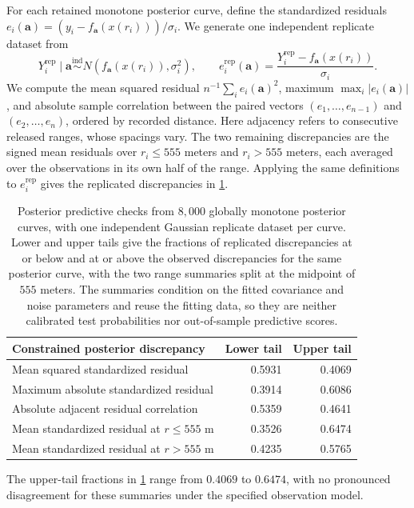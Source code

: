 For each retained monotone posterior curve, define the standardized residuals $e_i(\boldsymbol{a})=(y_i-f_{\boldsymbol{a}}(x(r_i)))/\sigma_i$.
We generate one independent replicate dataset from
\[
 Y_i^{\mathrm{rep}}\mid \boldsymbol{a}\overset{\mathrm{ind}}\sim N(f_{\boldsymbol{a}}(x(r_i)),\sigma_i^2),
 \qquad e_i^{\mathrm{rep}}(\boldsymbol{a})=\frac{Y_i^{\mathrm{rep}}-f_{\boldsymbol{a}}(x(r_i))}{\sigma_i}.
\]
We compute the mean squared residual $n^{-1}\sum_i e_i(\boldsymbol{a})^2$, maximum $\max_i|e_i(\boldsymbol{a})|$, and absolute sample correlation between the paired vectors $(e_1,\ldots,e_{n-1})$ and $(e_2,\ldots,e_n)$, ordered by recorded distance.
Here adjacency refers to consecutive released ranges, whose spacings vary. The two remaining discrepancies are the signed mean residuals over $r_i\leq555$ meters and $r_i>555$ meters, each averaged over the observations in its own half of the range. Applying the same definitions to $e_i^{\mathrm{rep}}$ gives the replicated discrepancies in \cref{tab:lidarcriticism}.

\begin{table}[htbp]
\centering
\begin{tabular}{lrr}
\toprule
Constrained posterior discrepancy & Lower tail & Upper tail \\
\midrule
Mean squared standardized residual & 0.5931 & 0.4069 \\
Maximum absolute standardized residual & 0.3914 & 0.6086 \\
Absolute adjacent residual correlation & 0.5359 & 0.4641 \\
Mean standardized residual at $r\leq555$ m & 0.3526 & 0.6474 \\
Mean standardized residual at $r>555$ m & 0.4235 & 0.5765 \\
\bottomrule
\end{tabular}
\caption[Residual checks for mercury lidar]{
Posterior predictive checks from $8{,}000$ globally monotone posterior curves, with one independent Gaussian replicate dataset per curve.
Lower and upper tails give the fractions of replicated discrepancies at or below and at or above the observed discrepancies for the same posterior curve, with the two range summaries split at the midpoint of $555$ meters.
The summaries condition on the fitted covariance and noise parameters and reuse the fitting data, so they are neither calibrated test probabilities nor out-of-sample predictive scores.}
\label{tab:lidarcriticism}
\end{table}

The upper-tail fractions in \cref{tab:lidarcriticism} range from
$0.4069$ to $0.6474$, with no pronounced disagreement for these
summaries under the specified observation model.
